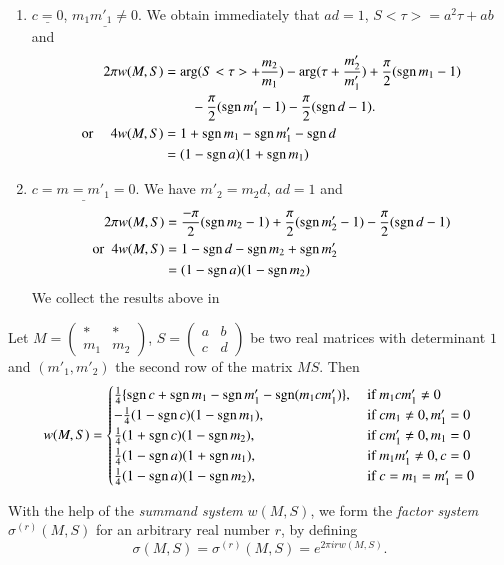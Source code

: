 \begin{enumerate}
\item $\underline{c=0}$, $\underline{m_1 m'_1\neq 0}$. We obtain
  immediately that $ad=1$, $S<\tau>=a^2\tau + ab$ and 
\begin{align*}
2\pi w (M,S) & = \arg(S<\tau> + \frac{m_2}{m_1}) -
\arg(\tau+\frac{m'_2}{m'_1}) + \frac{\pi}{2} (\operatorname{sgn} m_1-1)\\
& \qquad - \frac{\pi}{2} (\operatorname{sgn} m'_1-1) -\frac{\pi}{2} (\operatorname{sgn} d-1).\\
\text{or }\quad  4w(M,S)& =1+\operatorname{sgn} m_1-\operatorname{sgn} m'_1-\operatorname{sgn} d\\
&=(1-\operatorname{sgn} a)(1+\operatorname{sgn} m_1)
\end{align*}

\item $\underline{c=m = m'_1 = 0}$. We have $m'_2=m_2d$, $ad=1$ and
\begin{align*}
2\pi w (M,S) & = \frac{-\pi}{2} (\operatorname{sgn} m_2-1) + \frac{\pi}{2} (\operatorname{sgn}
m'_2-1) -\frac{\pi}{2} (\operatorname{sgn} d-1)\\
\text{or }\; 4w(M,S) & = 1 - \operatorname{sgn} d-\operatorname{sgn} m_2 + \operatorname{sgn} m'_2\\
&=(1-\operatorname{sgn} a)(1-\operatorname{sgn} m_2)
\end{align*}
We collect the results above in 
\end{enumerate}

\begin{thm}\label{chap3:thm16}
Let $M=\left(\begin{smallmatrix} \ast&\ast\\m_1 &
  m_2 \end{smallmatrix} \right)$, $S =
\left(\begin{smallmatrix} a&b\\c&d \end{smallmatrix} \right)$ be two
real matrices with determinant $1$ and $(m'_1,m'_2)$ the second row of
the matrix $MS$. Then 
{\fontsize{10}{11}\selectfont
$$
w(M,S) = 
\begin{cases}
\frac{1}{4}\{\operatorname{sgn} c+ \operatorname{sgn} m_1 - \operatorname{sgn} m'_1-\operatorname{sgn}(m_1 c m'_1)\}, &
\text{ if } m_1 cm'_1 \neq 0\\
-\frac{1}{4} (1-\operatorname{sgn} c) (1-\operatorname{sgn} m_1), & \text{ if } cm_1 \neq 0,
m'_1=0\\
\frac{1}{4} (1+\operatorname{sgn} c)(1-\operatorname{sgn} m_2), & \text{ if } cm'_1 \neq 0,
m_1=0\\
\frac{1}{4} (1-\operatorname{sgn} a)(1+\operatorname{sgn} m_1), & \text{ if } m_1 m'_1 \neq 0,
c=0\\
\frac{1}{4} (1-\operatorname{sgn} a)(1-\operatorname{sgn} m_2), & \text{ if } c=m_1=m'_1=0
\end{cases}
$$}\relax

With \pageoriginale the help of the \textit{summand system} $w(M,S)$,
we form the 
\textit{factor system} $\sigma^{(r)}(M,S)$ for an arbitrary real
number $r$, by defining
$$
\sigma(M,S) = \sigma^{(r)} (M,S) = e^{2\pi i r w (M,S)}.
$$
\end{thm}

